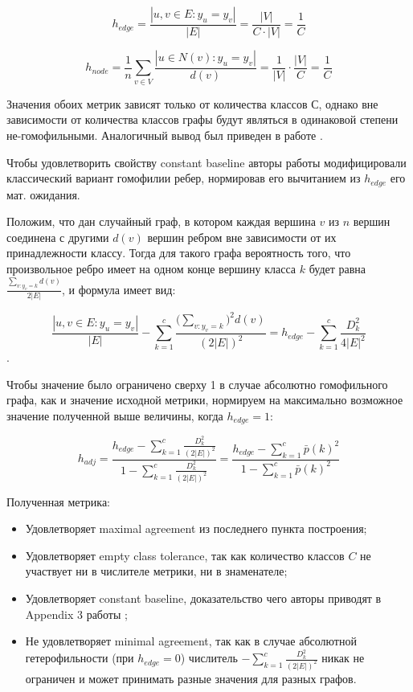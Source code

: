 \documentclass[a4paper,14pt]{article}
\begin{document}
	$$ h_{edge} = \dfrac{ |{u, v} \in E: y_u = y_v| }{ |E| } = \dfrac{ |V| }{ C \cdot |V| } = \frac{1}{C} $$
	
	$$ h_{node} = \dfrac{1}{n} \sum_{v \in V} \dfrac{|u \in N(v): y_u = y_v|}{ d(v) } = \dfrac{1}{|V|} \cdot \dfrac{|V|}{C} = \dfrac{1}{C} $$
	
	Значения обоих метрик зависят только от количества классов С, однако вне зависимости от количества классов графы будут являться в одинаковой степени не-гомофильными.
	Аналогичный вывод был приведен в работе \cite{lim2021large}.
	
	Чтобы удовлетворить свойству constant baseline авторы работы модифицировали классический вариант гомофилии ребер, нормировав его вычитанием из $ h_{edge} $ его мат. ожидания.
	
	Положим, что дан случайный граф, в котором каждая вершина $v$ из $n$ вершин соединена с другими $d(v)$ вершин ребром вне зависимости от их принадлежности классу.
	Тогда для такого графа вероятность того, что произвольное ребро имеет на одном конце вершину класса $k$ будет равна $ \frac{\sum_{v: y_v = k} d(v)}{2|E|} $, и формула имеет вид:
	
	$$ \frac{ |{u, v} \in E: y_u = y_v| }{ |E| } - \sum_{k=1}^{c} \frac{\bigl( \sum_{v: y_v = k} \bigr)^2 d(v)}{(2|E|)^2} = h_{edge} - \sum_{k=1}^{c} \frac{D_k^2}{4|E|^2} $$.
	
	Чтобы значение было ограничено сверху 1 в случае абсолютно гомофильного графа, как и значение исходной метрики, нормируем на максимально возможное значение полученной выше величины, когда $ h_{edge} = 1 $:
	
	$$ h_{adj} = \frac{ h_{edge} - \sum_{k=1}^{c} \frac{D_k^2}{(2|E|)^2} }{ 1 - \sum_{k=1}^{c} \frac{D_k^2}{(2|E|)^2}} = \frac{ h_{edge} - \sum_{k=1}^{c} \bar{p}(k)^2 }{1 - \sum_{k=1}^{c} \bar{p}(k)^2 } $$
	
	Полученная метрика:
	
	\begin{itemize}
	
		\item Удовлетворяет maximal agreement из последнего пункта построения;
		
		\item Удовлетворяет empty class tolerance, так как количество классов $C$ не участвует ни в числителе метрики, ни в знаменателе;
		
		\item Удовлетворяет constant baseline, доказательство чего авторы приводят в Appendix 3 работы \cite{platonov2022characterizing};
		
		\item Не удовлетворяет minimal agreement, так как в случае абсолютной гетерофильности (при $ h_{edge} = 0 $) числитель $ - \sum_{k=1}^{c} \frac{D_k^2}{(2|E|)^2} $ никак не ограничен и может принимать разные значения для разных графов.
		
	\end{itemize}
\end{document}

